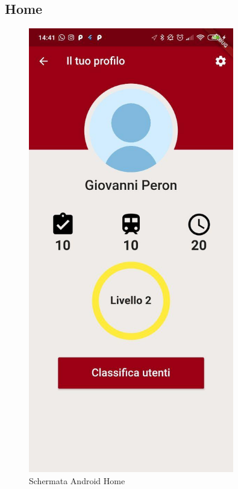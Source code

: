 \subsection{Home}
\vspace{-\parskip}
\begin{minipage}{0.45\textwidth}
\begin{figure}[H]
	\centering
	\includegraphics[width=0.8\textwidth]{immagini/profile.jpg}
	\caption{Schermata Android Home}
\end{figure}
\end{minipage}
